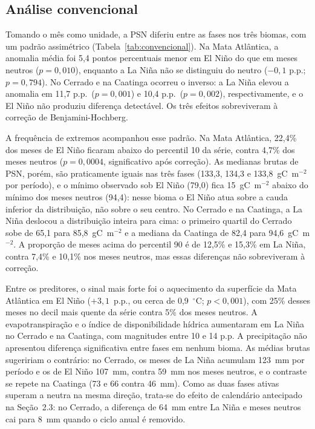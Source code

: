 \documentclass[a4paper,fleqn]{cas-sc}
\begin{document}
\subsection{Análise convencional}

Tomando o mês como unidade, a PSN diferiu entre as fases nos três biomas, com um padrão assimétrico (Tabela~\ref{tab:convencional}). Na Mata Atlântica, a anomalia média foi 5,4 pontos percentuais menor em El Niño do que em meses neutros ($p = 0{,}010$), enquanto a La Niña não se distinguiu do neutro ($-0{,}1$ p.p.; $p = 0{,}794$). No Cerrado e na Caatinga ocorreu o inverso: a La Niña elevou a anomalia em 11,7 p.p.\ ($p = 0{,}001$) e 10,4 p.p.\ ($p = 0{,}002$), respectivamente, e o El Niño não produziu diferença detectável. Os três efeitos sobreviveram à correção de Benjamini-Hochberg.

A frequência de extremos acompanhou esse padrão. Na Mata Atlântica, 22,4\% dos meses de El Niño ficaram abaixo do percentil 10 da série, contra 4,7\% dos meses neutros ($p = 0{,}0004$, significativo após correção). As medianas brutas de PSN, porém, são praticamente iguais nas três fases (133,3, 134,3 e 133,8~gC~m$^{-2}$ por período), e o mínimo observado sob El Niño (79,0) fica 15~gC~m$^{-2}$ abaixo do mínimo dos meses neutros (94,4): nesse bioma o El Niño atua sobre a cauda inferior da distribuição, não sobre o seu centro. No Cerrado e na Caatinga, a La Niña deslocou a distribuição inteira para cima: o primeiro quartil do Cerrado sobe de 65,1 para 85,8~gC~m$^{-2}$ e a mediana da Caatinga de 82,4 para 94,6~gC~m$^{-2}$. A proporção de meses acima do percentil 90 é de 12,5\% e 15,3\% em La Niña, contra 7,4\% e 10,1\% nos meses neutros, mas essas diferenças não sobreviveram à correção.

Entre os preditores, o sinal mais forte foi o aquecimento da superfície da Mata Atlântica em El Niño ($+3{,}1$~p.p., ou cerca de 0,9~$^{\circ}$C; $p < 0{,}001$), com 25\% desses meses no decil mais quente da série contra 5\% dos meses neutros. A evapotranspiração e o índice de disponibilidade hídrica aumentaram em La Niña no Cerrado e na Caatinga, com magnitudes entre 10 e 14 p.p. A precipitação não apresentou diferença significativa entre fases em nenhum bioma. As médias brutas sugeririam o contrário: no Cerrado, os meses de La Niña acumulam 123~mm por período e os de El Niño 107~mm, contra 59~mm nos meses neutros, e o contraste se repete na Caatinga (73 e 66 contra 46~mm). Como as duas fases ativas superam a neutra na mesma direção, trata-se do efeito de calendário antecipado na Seção~2.3: no Cerrado, a diferença de 64~mm entre La Niña e meses neutros cai para 8~mm quando o ciclo anual é removido.
\end{document}
